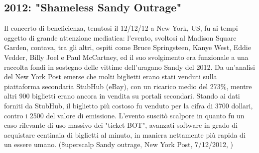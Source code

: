 \subsection{2012: "Shameless Sandy Outrage"}
Il concerto di beneficienza, tenutosi il 12/12/12 a New York, US, fu ai tempi oggetto di grande attenzione mediatica: l'evento, svoltosi al Madison Square Garden, contava, tra gli altri, ospiti come Bruce Springsteen, Kanye West, Eddie Vedder, Billy Joel e Paul McCartney, ed il suo svolgimento era funzionale a una raccolta fondi in sostegno delle vittime dell'uragano Sandy del 2012.
Da un'analisi del New York Post emerse che molti biglietti erano stati venduti sulla piattaforma secondaria StubHub (eBay), con un ricarico medio del 273\%, mentre altri 900 biglietti erano ancora in vendita su portali secondari. Stando ai dati forniti da StubHub, il biglietto più costoso fu venduto per la cifra di 3700 dollari, contro i 2500 del valore di emissione. 
L'evento suscitò scalpore in quanto fu un caso rilevante di uso massivo dei "ticket BOT", avanzati software in grado di acquistare centinaia di biglietti al minuto, in maniera nettamente più rapida di un essere umano. (\$uperscalp Sandy outrage, New York Post, 7/12/2012, \cite{tompkins2018ticket})

